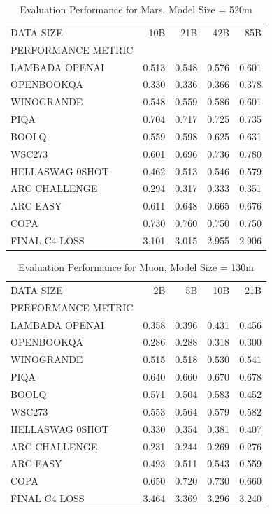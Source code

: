 \begin{table}
[H] \centering \caption{Evaluation Performance for Mars, Model Size = 520m}
\label{tab:eval-performance-mars-520M}
\begin{tabular}{lrrrr}
\toprule
DATA SIZE & 10B & 21B & 42B & 85B \\
PERFORMANCE METRIC &  &  &  &  \\
\midrule
LAMBADA OPENAI & 0.513 & 0.548 & 0.576 & 0.601 \\
OPENBOOKQA & 0.330 & 0.336 & 0.366 & 0.378 \\
WINOGRANDE & 0.548 & 0.559 & 0.586 & 0.601 \\
PIQA & 0.704 & 0.717 & 0.725 & 0.735 \\
BOOLQ & 0.559 & 0.598 & 0.625 & 0.631 \\
WSC273 & 0.601 & 0.696 & 0.736 & 0.780 \\
HELLASWAG 0SHOT & 0.462 & 0.513 & 0.546 & 0.579 \\
ARC CHALLENGE & 0.294 & 0.317 & 0.333 & 0.351 \\
ARC EASY & 0.611 & 0.648 & 0.665 & 0.676 \\
COPA & 0.730 & 0.760 & 0.750 & 0.750 \\
FINAL C4 LOSS & 3.101 & 3.015 & 2.955 & 2.906 \\
\bottomrule
\end{tabular}
\end{table}


\begin{table}
[H] \centering \caption{Evaluation Performance for Muon, Model Size = 130m}
\label{tab:eval-performance-muon-130M}
\begin{tabular}{lrrrr}
\toprule
DATA SIZE & 2B & 5B & 10B & 21B \\
PERFORMANCE METRIC &  &  &  &  \\
\midrule
LAMBADA OPENAI & 0.358 & 0.396 & 0.431 & 0.456 \\
OPENBOOKQA & 0.286 & 0.288 & 0.318 & 0.300 \\
WINOGRANDE & 0.515 & 0.518 & 0.530 & 0.541 \\
PIQA & 0.640 & 0.660 & 0.670 & 0.678 \\
BOOLQ & 0.571 & 0.504 & 0.583 & 0.452 \\
WSC273 & 0.553 & 0.564 & 0.579 & 0.582 \\
HELLASWAG 0SHOT & 0.330 & 0.354 & 0.381 & 0.407 \\
ARC CHALLENGE & 0.231 & 0.244 & 0.269 & 0.276 \\
ARC EASY & 0.493 & 0.511 & 0.543 & 0.559 \\
COPA & 0.650 & 0.720 & 0.730 & 0.660 \\
FINAL C4 LOSS & 3.464 & 3.369 & 3.296 & 3.240 \\
\bottomrule
\end{tabular}
\end{table}


